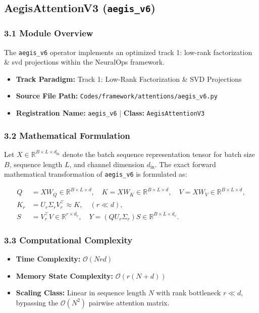 \subsection{AegisAttentionV3 (\texttt{aegis\_v6})}
\label{sec:app_module_aegis\_v6}

\subsubsection*{3.1 Module Overview}
The \texttt{aegis\_v6} operator implements an optimized track 1: low-rank factorization \& svd projections within the NeuralOps framework.
\begin{itemize}
    \item \textbf{Track Paradigm:} Track 1: Low-Rank Factorization & SVD Projections
    \item \textbf{Source File Path:} \texttt{Codes/framework/attentions/aegis\_v6.py}
    \item \textbf{Registration Name:} \texttt{aegis\_v6} $\mid$ \textbf{Class:} \texttt{AegisAttentionV3}
\end{itemize}

\subsubsection*{3.2 Mathematical Formulation}
Let $X \in \mathbb{R}^{B \times L \times d_{\text{in}}}$ denote the batch sequence representation tensor for batch size $B$, sequence length $L$, and channel dimension $d_{\text{in}}$. The exact forward mathematical transformation of \texttt{aegis\_v6} is formulated as:

\begin{align}
Q &= X W_Q \in \mathbb{R}^{B \times L \times d}, \quad K = X W_K \in \mathbb{R}^{B \times L \times d}, \quad V = X W_V \in \mathbb{R}^{B \times L \times d}, \\
K_r &= U_r \Sigma_r V_r^\top \approx K, \quad (r \ll d), \\
S &= V_r^\top V \in \mathbb{R}^{r \times d_v}, \quad Y = (Q U_r \Sigma_r) S \in \mathbb{R}^{B \times L \times d_v}.
\end{align}


\subsubsection*{3.3 Computational Complexity}
\begin{itemize}
    \item \textbf{Time Complexity:} $\mathcal{O}(N r d)$
    \item \textbf{Memory State Complexity:} $\mathcal{O}(r(N + d))$
    \item \textbf{Scaling Class:} Linear in sequence length $N$ with rank bottleneck $r \ll d$, bypassing the $\mathcal{O}(N^2)$ pairwise attention matrix.
\end{itemize}

